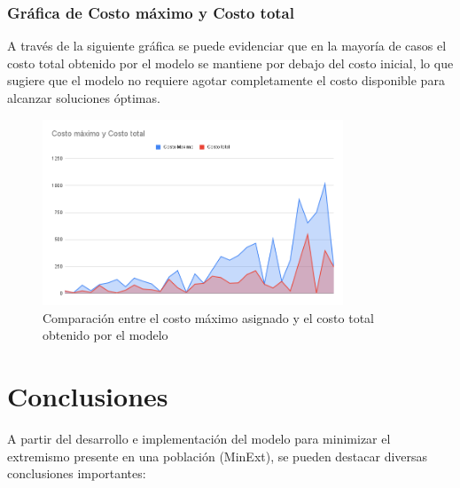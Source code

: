 \documentclass[11pt,letter]{article}
\begin{document}
\subsubsection*{Gráfica de Costo máximo y Costo total}


A través de la siguiente gráfica se puede evidenciar que en la mayoría de casos el costo total obtenido por el modelo se mantiene por debajo del costo inicial, lo que sugiere que el modelo no requiere agotar completamente el costo disponible para alcanzar soluciones óptimas.


\begin{figure}[H]
    \centering
    \includegraphics[width=0.8\textwidth]{resources/costomaximoycostototal.png}
    \caption{Comparación entre el costo máximo asignado y el costo total obtenido por el modelo}
\end{figure}



\section{Conclusiones}

A partir del desarrollo e implementación del modelo para minimizar el extremismo presente en una población (MinExt), se pueden destacar diversas conclusiones importantes:
\end{document}
